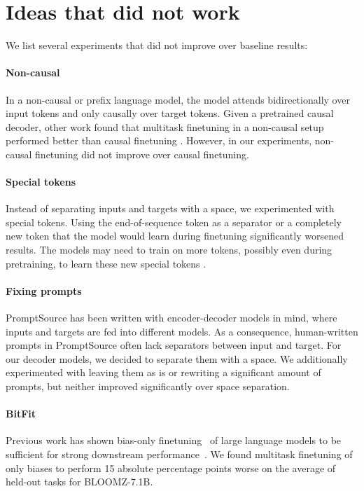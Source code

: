 \documentclass[11pt]{article}
\begin{document}
\section{Ideas that did not work}
\label{sec:failures}

We list several experiments that did not improve over baseline results:

\paragraph{Non-causal} In a non-causal or prefix language model, the model attends bidirectionally over input tokens and only causally over target tokens. Given a pretrained causal decoder, other work found that multitask finetuning in a non-causal setup performed better than causal finetuning \cite{wang2022language,tay2022transcending}. However, in our experiments, non-causal finetuning did not improve over causal finetuning.

\paragraph{Special tokens} Instead of separating inputs and targets with a space, we experimented with special tokens. Using the end-of-sequence token as a separator or a completely new token that the model would learn during finetuning significantly worsened results. The models may need to train on more tokens, possibly even during pretraining, to learn these new special tokens \cite{zeng2022glm}.

\paragraph{Fixing prompts} PromptSource has been written with encoder-decoder models in mind, where inputs and targets are fed into different models. As a consequence, human-written prompts in PromptSource often lack separators between input and target. For our decoder models, we decided to separate them with a space. We additionally experimented with leaving them as is or rewriting a significant amount of prompts, but neither improved significantly over space separation.

\paragraph{BitFit} Previous work has shown bias-only finetuning~\cite{zaken2021bitfit} of large language models to be sufficient for strong downstream performance~\cite{logan2021cutting,hu2021lora,muennighoff2022sgpt,liu2022few,ding2022delta,muennighoff2022mteb}. We found multitask finetuning of only biases to perform 15 absolute percentage points worse on the average of held-out tasks for BLOOMZ-7.1B.
\end{document}
